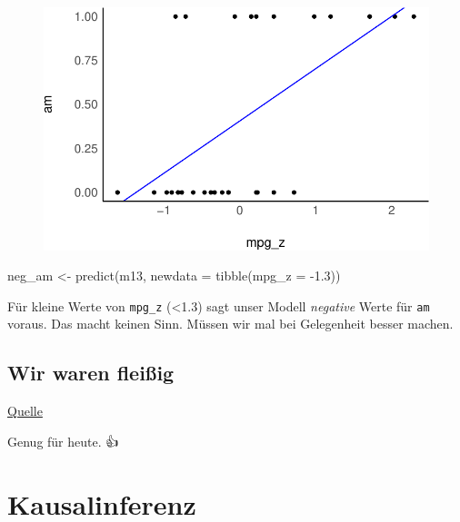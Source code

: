 \documentclass[
  a4paper,
  DIV=11]{scrreprt}
\newenvironment{Shaded}{\begin{snugshade}}{\end{snugshade}}
\newcommand{\AttributeTok}[1]{\textcolor[rgb]{0.40,0.45,0.13}{#1}}
\newcommand{\FloatTok}[1]{\textcolor[rgb]{0.68,0.00,0.00}{#1}}
\newcommand{\FunctionTok}[1]{\textcolor[rgb]{0.28,0.35,0.67}{#1}}
\newcommand{\NormalTok}[1]{\textcolor[rgb]{0.00,0.23,0.31}{#1}}
\newcommand{\OtherTok}[1]{\textcolor[rgb]{0.00,0.23,0.31}{#1}}
\newcommand{\SpecialCharTok}[1]{\textcolor[rgb]{0.37,0.37,0.37}{#1}}
\theoremstyle{definition}
\theoremstyle{remark}
\begin{document}
\begin{figure}[H]

{\centering \includegraphics{./metrische-AV_files/figure-pdf/unnamed-chunk-55-1.pdf}

}

\end{figure}

\begin{Shaded}
\begin{Highlighting}[]
\NormalTok{neg\_am }\OtherTok{\textless{}{-}} \FunctionTok{predict}\NormalTok{(m13, }\AttributeTok{newdata =} \FunctionTok{tibble}\NormalTok{(}\AttributeTok{mpg\_z =} \SpecialCharTok{{-}}\FloatTok{1.3}\NormalTok{))}
\end{Highlighting}
\end{Shaded}

Für kleine Werte von \texttt{mpg\_z} (\textless1.3) sagt unser Modell
\emph{negative} Werte für \texttt{am} voraus. Das macht keinen Sinn.
Müssen wir mal bei Gelegenheit besser machen.

\hypertarget{wir-waren-fleiuxdfig}{%
\section{Wir waren fleißig}\label{wir-waren-fleiuxdfig}}

\href{https://giphy.com/gifs/XIqCQx02E1U9W}{Quelle}

Genug für heute. 👍


\hypertarget{kausalinferenz}{%
\chapter{Kausalinferenz}\label{kausalinferenz}}
\end{document}
